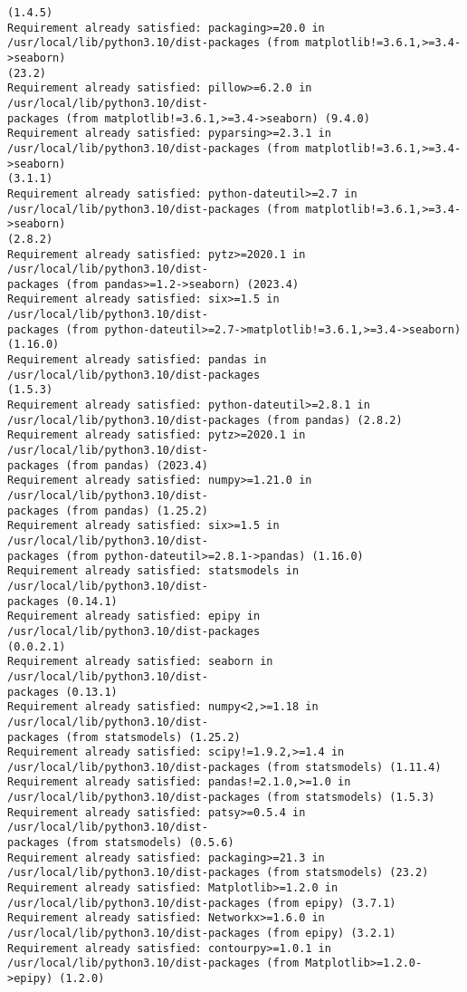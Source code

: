 \documentclass[11pt]{article}
\begin{document}
\begin{Verbatim}[commandchars=\\\{\}]
(1.4.5)
Requirement already satisfied: packaging>=20.0 in
/usr/local/lib/python3.10/dist-packages (from matplotlib!=3.6.1,>=3.4->seaborn)
(23.2)
Requirement already satisfied: pillow>=6.2.0 in /usr/local/lib/python3.10/dist-
packages (from matplotlib!=3.6.1,>=3.4->seaborn) (9.4.0)
Requirement already satisfied: pyparsing>=2.3.1 in
/usr/local/lib/python3.10/dist-packages (from matplotlib!=3.6.1,>=3.4->seaborn)
(3.1.1)
Requirement already satisfied: python-dateutil>=2.7 in
/usr/local/lib/python3.10/dist-packages (from matplotlib!=3.6.1,>=3.4->seaborn)
(2.8.2)
Requirement already satisfied: pytz>=2020.1 in /usr/local/lib/python3.10/dist-
packages (from pandas>=1.2->seaborn) (2023.4)
Requirement already satisfied: six>=1.5 in /usr/local/lib/python3.10/dist-
packages (from python-dateutil>=2.7->matplotlib!=3.6.1,>=3.4->seaborn) (1.16.0)
Requirement already satisfied: pandas in /usr/local/lib/python3.10/dist-packages
(1.5.3)
Requirement already satisfied: python-dateutil>=2.8.1 in
/usr/local/lib/python3.10/dist-packages (from pandas) (2.8.2)
Requirement already satisfied: pytz>=2020.1 in /usr/local/lib/python3.10/dist-
packages (from pandas) (2023.4)
Requirement already satisfied: numpy>=1.21.0 in /usr/local/lib/python3.10/dist-
packages (from pandas) (1.25.2)
Requirement already satisfied: six>=1.5 in /usr/local/lib/python3.10/dist-
packages (from python-dateutil>=2.8.1->pandas) (1.16.0)
Requirement already satisfied: statsmodels in /usr/local/lib/python3.10/dist-
packages (0.14.1)
Requirement already satisfied: epipy in /usr/local/lib/python3.10/dist-packages
(0.0.2.1)
Requirement already satisfied: seaborn in /usr/local/lib/python3.10/dist-
packages (0.13.1)
Requirement already satisfied: numpy<2,>=1.18 in /usr/local/lib/python3.10/dist-
packages (from statsmodels) (1.25.2)
Requirement already satisfied: scipy!=1.9.2,>=1.4 in
/usr/local/lib/python3.10/dist-packages (from statsmodels) (1.11.4)
Requirement already satisfied: pandas!=2.1.0,>=1.0 in
/usr/local/lib/python3.10/dist-packages (from statsmodels) (1.5.3)
Requirement already satisfied: patsy>=0.5.4 in /usr/local/lib/python3.10/dist-
packages (from statsmodels) (0.5.6)
Requirement already satisfied: packaging>=21.3 in
/usr/local/lib/python3.10/dist-packages (from statsmodels) (23.2)
Requirement already satisfied: Matplotlib>=1.2.0 in
/usr/local/lib/python3.10/dist-packages (from epipy) (3.7.1)
Requirement already satisfied: Networkx>=1.6.0 in
/usr/local/lib/python3.10/dist-packages (from epipy) (3.2.1)
Requirement already satisfied: contourpy>=1.0.1 in
/usr/local/lib/python3.10/dist-packages (from Matplotlib>=1.2.0->epipy) (1.2.0)

\end{Verbatim}
\end{document}

